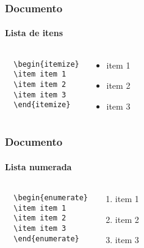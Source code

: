\begin{frame}[fragile]
\frametitle{Documento}
\framesubtitle{Lista de itens}
  \scriptsize
  \begin{columns}[c]
  \begin{verbatim}
  \begin{itemize}
  \item item 1
  \item item 2
  \item item 3
  \end{itemize}
  \end{verbatim}
  \begin{fmpage}{\textwidth}
  \begin{itemize}
  \item item 1
  \item item 2
  \item item 3
  \end{itemize}
  \end{fmpage}
  \end{columns}
\end{frame}



\begin{frame}[fragile]
\frametitle{Documento}
\framesubtitle{Lista numerada}
  \scriptsize
  \begin{columns}[c]
  \begin{verbatim}
  \begin{enumerate}
  \item item 1
  \item item 2
  \item item 3
  \end{enumerate}
  \end{verbatim}
  \begin{fmpage}{\textwidth}
  \begin{enumerate}
  \item item 1
  \item item 2
  \item item 3
  \end{enumerate}
  \end{fmpage}
  \end{columns}
\end{frame}



